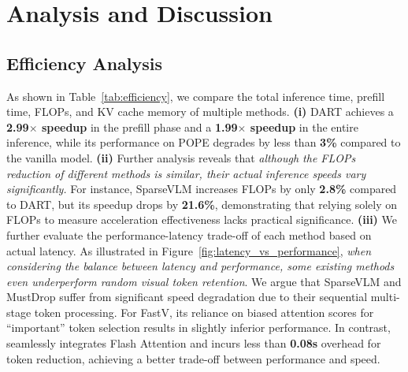 \vspace{-2mm}
\section{Analysis and Discussion}\label{sec:discussion}
% 
\vspace{-2mm}
\subsection{Efficiency Analysis}
\vspace{-1mm}
As shown in Table~\ref{tab:efficiency}, we compare the total inference time, prefill time, FLOPs, and KV cache memory of multiple methods. 
\textbf{(i)}  DART achieves a \textbf{2.99$\times$ speedup} in the prefill phase and a \textbf{1.99$\times$ speedup} in the entire inference, while its performance on POPE degrades by less than \textbf{3\%} compared to the vanilla model.  
\textbf{(ii)} Further analysis reveals that \emph{{although the FLOPs reduction of different methods is similar, their actual inference speeds vary significantly.}} For instance, SparseVLM increases FLOPs by only \textbf{2.8\%} compared to DART, but its speedup drops by \textbf{21.6\%}, demonstrating that relying solely on FLOPs to measure acceleration effectiveness lacks practical significance.  
\textbf{(iii)} We further evaluate the performance-latency trade-off of each method based on actual latency. As illustrated in Figure~\ref{fig:latency_vs_performance}, \emph{{when considering the balance between latency and performance, some existing methods even underperform random visual token retention}}. We argue that SparseVLM and MustDrop suffer from significant speed degradation due to their sequential multi-stage token processing.
For FastV, its reliance on biased attention scores for ``important'' token selection results in slightly inferior performance. In contrast, \algname seamlessly integrates Flash Attention and incurs less than \textbf{0.08s} overhead for token reduction, achieving a better trade-off between performance and speed.


\vspace{-2mm}

